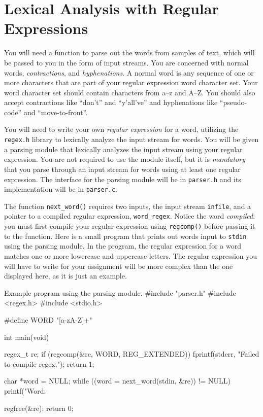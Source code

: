 \section{Lexical Analysis with Regular Expressions}

\noindent You will need a function to parse out the words from samples of text,
which will be passed to you in the form of input streams. You are concerned with
normal words, \emph{contractions}, and \emph{hyphenations}. A normal word is any
sequence of one or more characters that are part of your regular expression word
character set. Your word character set should contain characters from a--z and
A--Z. You should also accept contractions like ``don't'' and ``y'all've'' and
hyphenations like ``pseudo-code'' and ``move-to-front''.

You will need to write your own \emph{regular expression} for a word, utilizing
the \texttt{regex.h} library to lexically analyze the input stream for words.
You will be given a parsing module that lexically analyzes the input stream
using your regular expression. You are not required to use the module itself,
but it is \emph{mandatory} that you parse through an input stream for words
using at least one regular expression. The interface for the parsing module will
be in \texttt{parser.h} and its implementation will be in \texttt{parser.c}.

The function \texttt{next\_word()} requires two inputs, the input stream
\texttt{infile}, and a pointer to a compiled regular expression,
\texttt{word\_regex}. Notice the word \emph{compiled}: you must first compile
your regular expression using \texttt{regcomp()} before passing it to the
function. Here is a small program that prints out words input to \texttt{stdin}
using the parsing module. In the program, the regular expression for a word
matches one or more lowercase and uppercase letters. The regular expression you
will have to write for your assignment will be more complex than the one
displayed here, as it is just an example.

\begin{clisting}{Example program using the parsing module.}
#include "parser.h"
#include <regex.h>
#include <stdio.h>

#define WORD "[a-zA-Z]+"

int main(void) {
    regex_t re;
    if (regcomp(&re, WORD, REG_EXTENDED)) {
        fprintf(stderr, "Failed to compile regex.\n");
        return 1;
    }

    char *word = NULL;
    while ((word = next_word(stdin, &re)) != NULL) {
        printf("Word: %
    }

    regfree(&re);
    return 0;
}
\end{clisting}
